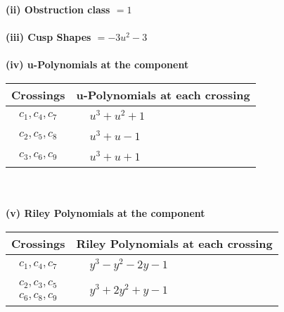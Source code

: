 \documentclass[1p]{elsarticle_modified}
\theoremstyle{definition}
\begin{document}
\flushleft \textbf{(ii) Obstruction class $= 1$}\\~\\
\flushleft \textbf{(iii) Cusp Shapes $= -3 u^2-3$}\\~\\
\newpage\renewcommand{\arraystretch}{1}
\flushleft \textbf{(iv) u-Polynomials at the component}\newline \\
\begin{tabular}{m{50pt}|m{274pt}}
Crossings & \hspace{64pt}u-Polynomials at each crossing \\
\hline $$\begin{aligned}c_{1},c_{4},c_{7}\end{aligned}$$&$\begin{aligned}
&u^3+u^2+1
\end{aligned}$\\
\hline $$\begin{aligned}c_{2},c_{5},c_{8}\end{aligned}$$&$\begin{aligned}
&u^3+u-1
\end{aligned}$\\
\hline $$\begin{aligned}c_{3},c_{6},c_{9}\end{aligned}$$&$\begin{aligned}
&u^3+u+1
\end{aligned}$\\
\hline
\end{tabular}\\~\\
\newpage\renewcommand{\arraystretch}{1}
\flushleft \textbf{(v) Riley Polynomials at the component}\newline \\
\begin{tabular}{m{50pt}|m{274pt}}
Crossings & \hspace{64pt}Riley Polynomials at each crossing \\
\hline $$\begin{aligned}c_{1},c_{4},c_{7}\end{aligned}$$&$\begin{aligned}
&y^3- y^2-2 y-1
\end{aligned}$\\
\hline $$\begin{aligned}c_{2},c_{3},c_{5}\\c_{6},c_{8},c_{9}\end{aligned}$$&$\begin{aligned}
&y^3+2 y^2+y-1
\end{aligned}$\\
\hline
\end{tabular}\\~\\
\end{document}

